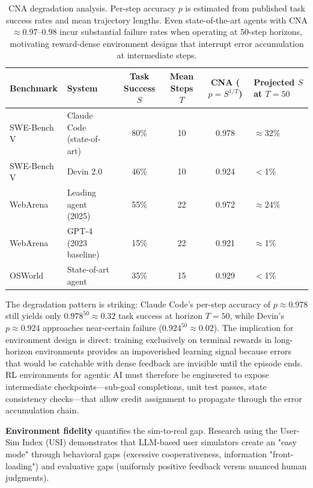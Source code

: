 \begin{table}[tbp]
\centering
\footnotesize
\begin{tabularx}{\textwidth}{YYcccY}
\toprule
\textbf{Benchmark} & \textbf{System} & \textbf{Task Success $S$} & \textbf{Mean Steps $T$} & \textbf{CNA ($p = S^{1/T}$)} & \textbf{Projected $S$ at $T{=}50$} \\
\midrule
SWE-Bench V & Claude Code (state-of-art) & 80\% & 10 & 0.978 & $\approx$32\% \\
SWE-Bench V & Devin 2.0 & 46\% & 10 & 0.924 & $<$1\% \\
WebArena & Leading agent (2025) & 55\% & 22 & 0.972 & $\approx$24\% \\
WebArena & GPT-4 (2023 baseline) & 15\% & 22 & 0.921 & $\approx$1\% \\
OSWorld & State-of-art agent & 35\% & 15 & 0.929 & $<$1\% \\
\bottomrule
\end{tabularx}
\caption{CNA degradation analysis. Per-step accuracy $p$ is estimated from published task success rates and mean trajectory lengths. Even state-of-the-art agents with CNA $\approx 0.97$--$0.98$ incur substantial failure rates when operating at 50-step horizons, motivating reward-dense environment designs that interrupt error accumulation at intermediate steps.}
\label{tbl:cna-degradation}
\end{table}

The degradation pattern is striking: Claude Code's per-step accuracy of $p \approx 0.978$ still yields only $0.978^{50} \approx 0.32$ task success at horizon $T=50$, while Devin's $p \approx 0.924$ approaches near-certain failure ($0.924^{50} \approx 0.02$). The implication for environment design is direct: training exclusively on terminal rewards in long-horizon environments provides an impoverished learning signal because errors that would be catchable with dense feedback are invisible until the episode ends. RL environments for agentic AI must therefore be engineered to expose intermediate checkpoints---sub-goal completions, unit test passes, state consistency checks---that allow credit assignment to propagate through the error accumulation chain.

\textbf{Environment fidelity} quantifies the sim-to-real gap. Research using the User-Sim Index (USI) demonstrates that LLM-based user simulators create an "easy mode" through behavioral gaps (excessive cooperativeness, information "front-loading") and evaluative gaps (uniformly positive feedback versus nuanced human judgments).

